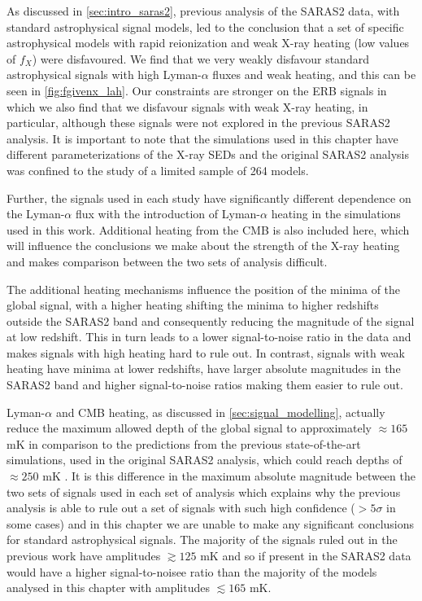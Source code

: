 As discussed in \cref{sec:intro_saras2}, previous analysis of the SARAS2 data, with standard astrophysical signal models, led to the conclusion that a set of specific astrophysical models with rapid reionization and weak X-ray heating (low values of $f_X$) were disfavoured. We find that we very weakly disfavour standard astrophysical signals with high Lyman-$\alpha$ fluxes and weak heating, and this can be seen in \cref{fig:fgivenx_lah}. Our constraints are stronger on the ERB signals in which we also find that we disfavour signals with weak X-ray heating, in particular, although these signals were not explored in the previous SARAS2 analysis. It is important to note that the simulations used in this chapter have different parameterizations of the X-ray SEDs and the original SARAS2 analysis was confined to the study of a limited sample of 264 models. 

Further, the signals used in each study have significantly different dependence on the Lyman-$\alpha$ flux with the introduction of Lyman-$\alpha$ heating in the simulations used in this work. Additional heating from the CMB is also included here, which will influence the conclusions we make about the strength of the X-ray heating and makes comparison between the two sets of analysis difficult. 

The additional heating mechanisms influence the position of the minima of the global signal, with a higher heating shifting the minima to higher redshifts outside the SARAS2 band and consequently reducing the magnitude of the signal at low redshift. This in turn leads to a lower signal-to-noise ratio in the data and makes signals with high heating hard to rule out. In contrast, signals with weak heating have minima at lower redshifts, have larger absolute magnitudes in the SARAS2 band and higher signal-to-noise ratios making them easier to rule out.

Lyman-$\alpha$ and CMB heating, as discussed in \cref{sec:signal_modelling}, actually reduce the maximum allowed depth of the global signal to approximately $\approx 165$ mK in comparison to the predictions from the previous state-of-the-art simulations, used in the original SARAS2 analysis, which could reach depths of $\approx 250$ mK \citep{Cohen_global_2017}. It is this difference in the maximum absolute magnitude between the two sets of signals used in each set of analysis which explains why the previous analysis is able to rule out a set of signals with such high confidence ($> 5\sigma$ in some cases) and in this chapter we are unable to make any significant conclusions for standard astrophysical signals. The majority of the signals ruled out in the previous work have amplitudes $\gtrsim 125$ mK and so if present in the SARAS2 data would have a higher signal-to-noisee ratio than the majority of the models analysed in this chapter with amplitudes $ \lesssim 165$ mK.

